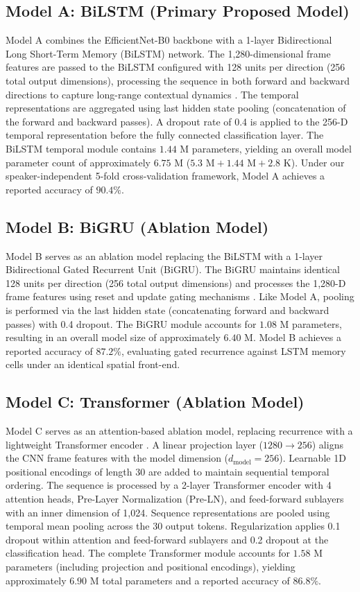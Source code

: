 \documentclass[journal]{IEEEtran}
\begin{document}
\subsection{Model A: BiLSTM (Primary Proposed Model)}
Model A combines the EfficientNet-B0 backbone with a 1-layer Bidirectional Long Short-Term Memory (BiLSTM) network. The 1,280-dimensional frame features are passed to the BiLSTM configured with 128 units per direction (256 total output dimensions), processing the sequence in both forward and backward directions to capture long-range contextual dynamics \cite{hochreiter1997long}. The temporal representations are aggregated using last hidden state pooling (concatenation of the forward and backward passes). A dropout rate of 0.4 is applied to the 256-D temporal representation before the fully connected classification layer. The BiLSTM temporal module contains $1.44\text{ M}$ parameters, yielding an overall model parameter count of approximately $6.75\text{ M}$ ($5.3\text{ M} + 1.44\text{ M} + 2.8\text{ K}$). Under our speaker-independent 5-fold cross-validation framework, Model A achieves a reported accuracy of $90.4\%$.

\subsection{Model B: BiGRU (Ablation Model)}
Model B serves as an ablation model replacing the BiLSTM with a 1-layer Bidirectional Gated Recurrent Unit (BiGRU). The BiGRU maintains identical 128 units per direction (256 total output dimensions) and processes the 1,280-D frame features using reset and update gating mechanisms \cite{cho2014learning}. Like Model A, pooling is performed via the last hidden state (concatenating forward and backward passes) with 0.4 dropout. The BiGRU module accounts for $1.08\text{ M}$ parameters, resulting in an overall model size of approximately $6.40\text{ M}$. Model B achieves a reported accuracy of $87.2\%$, evaluating gated recurrence against LSTM memory cells under an identical spatial front-end.

\subsection{Model C: Transformer (Ablation Model)}
Model C serves as an attention-based ablation model, replacing recurrence with a lightweight Transformer encoder \cite{vaswani2017attention}. A linear projection layer ($1280 \to 256$) aligns the CNN frame features with the model dimension ($d_{\text{model}} = 256$). Learnable 1D positional encodings of length 30 are added to maintain sequential temporal ordering. The sequence is processed by a 2-layer Transformer encoder with 4 attention heads, Pre-Layer Normalization (Pre-LN), and feed-forward sublayers with an inner dimension of 1,024. Sequence representations are pooled using temporal mean pooling across the 30 output tokens. Regularization applies 0.1 dropout within attention and feed-forward sublayers and 0.2 dropout at the classification head. The complete Transformer module accounts for $1.58\text{ M}$ parameters (including projection and positional encodings), yielding approximately $6.90\text{ M}$ total parameters and a reported accuracy of $86.8\%$.
\end{document}
